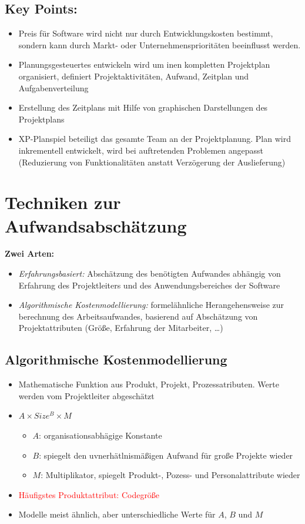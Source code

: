 \subsection{Key Points:}
\begin{itemize}
    \item Preis für Software wird nicht nur durch Entwicklungskosten bestimmt, sondern kann durch Markt- oder Unternehmensprioritäten beeinflusst werden. 
    \item Planungsgesteuertes entwickeln wird um inen kompletten Projektplan organisiert, definiert Projektaktivitäten, Aufwand, Zeitplan und Aufgabenverteilung
    \item Erstellung des Zeitplans mit Hilfe von graphischen Darstellungen des Projektplans 
    \item XP-Planspiel beteiligt das gesamte Team an der Projektplanung. Plan wird inkrementell entwickelt, wird bei auftretenden Problemen angepasst (Reduzierung von Funktionalitäten anstatt Verzögerung der Auslieferung)
\end{itemize}

\section{Techniken zur Aufwandsabschätzung}
\textbf{\large{Zwei Arten:}}
\begin{itemize}
    \item \textit{Erfahrungsbasiert:} Abschätzung des benötigten Aufwandes abhängig von Erfahrung des Projektleiters und des Anwendungsbereiches der Software 
    \item \textit{Algorithmische Kostenmodellierung:} formelähnliche Herangehensweise zur berechnung des Arbeitsaufwandes, basierend auf Abschätzung von Projektattributen (Größe, Erfahrung der Mitarbeiter, \dots)
\end{itemize}

\subsection{Algorithmische Kostenmodellierung}
\begin{itemize}
    \item Mathematische Funktion aus Produkt, Projekt, Prozessatributen. Werte werden vom Projektleiter abgeschätzt
    \item $A \times Size^{B} \times M$
    \begin{itemize}
        \item $A$: organisationsabhägige Konstante
        \item $B$: spiegelt den uvnerhätlnismäßigen Aufwand für große Projekte wieder
        \item $M$: Multiplikator, spiegelt Produkt-, Pozess- und Personalattribute wieder 
    \end{itemize}
    \item \textcolor{red}{Häufigstes Produktattribut: Codegröße}
    \item Modelle meist ähnlich, aber unterschiedliche Werte für $A$, $B$ und $M$
\end{itemize}

